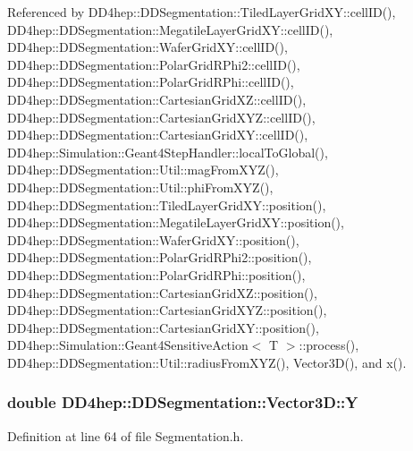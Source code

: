 Referenced by DD4hep::DDSegmentation::TiledLayerGridXY::cellID(), DD4hep::DDSegmentation::MegatileLayerGridXY::cellID(), DD4hep::DDSegmentation::WaferGridXY::cellID(), DD4hep::DDSegmentation::PolarGridRPhi2::cellID(), DD4hep::DDSegmentation::PolarGridRPhi::cellID(), DD4hep::DDSegmentation::CartesianGridXZ::cellID(), DD4hep::DDSegmentation::CartesianGridXYZ::cellID(), DD4hep::DDSegmentation::CartesianGridXY::cellID(), DD4hep::Simulation::Geant4StepHandler::localToGlobal(), DD4hep::DDSegmentation::Util::magFromXYZ(), DD4hep::DDSegmentation::Util::phiFromXYZ(), DD4hep::DDSegmentation::TiledLayerGridXY::position(), DD4hep::DDSegmentation::MegatileLayerGridXY::position(), DD4hep::DDSegmentation::WaferGridXY::position(), DD4hep::DDSegmentation::PolarGridRPhi2::position(), DD4hep::DDSegmentation::PolarGridRPhi::position(), DD4hep::DDSegmentation::CartesianGridXZ::position(), DD4hep::DDSegmentation::CartesianGridXYZ::position(), DD4hep::DDSegmentation::CartesianGridXY::position(), DD4hep::Simulation::Geant4SensitiveAction$<$ T $>$::process(), DD4hep::DDSegmentation::Util::radiusFromXYZ(), Vector3D(), and x().\hypertarget{struct_d_d4hep_1_1_d_d_segmentation_1_1_vector3_d_a9cde1750ebf8b923704e6118f00d1ed6}{
\subsubsection[{Y}]{\setlength{\rightskip}{0pt plus 5cm}double {\bf DD4hep::DDSegmentation::Vector3D::Y}}}
\label{struct_d_d4hep_1_1_d_d_segmentation_1_1_vector3_d_a9cde1750ebf8b923704e6118f00d1ed6}


Definition at line 64 of file Segmentation.h.

